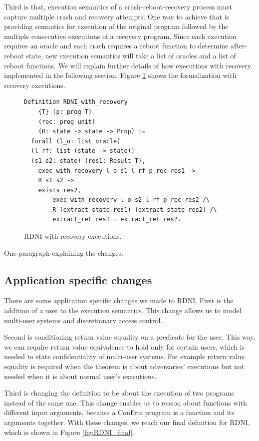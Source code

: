 Third is that, execution semantics of a crash-reboot-recovery process must capture multiple crash and recovery attempts. One way to achieve that is providing semantics for execution of the original program followed by the multiple consecutive executions of a recovery program. Since each execution requires an oracle and each crash requires a reboot function to determine after-reboot state, new execution semantics will take a list of oracles and a list of reboot functions. We will explain further details of how executions with recovery implemented in the following section. Figure \ref{fig:RDNI_recovery} shows the formalization with recovery executions.

\begin{figure}[ht]
    \centering
    \begin{verbatim}
Definition RDNI_with_recovery
    {T} (p: prog T) 
    (rec: prog unit)
    (R: state -> state -> Prop) :=
  forall (l_o: list oracle) 
  (l_rf: list (state -> state))
  (s1 s2: state) (res1: Result T),
    exec_with_recovery l_o s1 l_rf p rec res1 ->
    R s1 s2 ->
    exists res2,
        exec_with_recovery l_o s2 l_rf p rec res2 /\
        R (extract_state res1) (extract_state res2) /\
        extract_ret res1 = extract_ret res2.
    \end{verbatim}
    \caption{RDNI with recovery executions.}
    \label{fig:RDNI_recovery}
\end{figure}

{\color{red} One paragraph explaining the changes.}


\subsection{Application specific changes}
There are some application specific changes we made to RDNI. First is the addition of a user to the execution semantics. This change allows us to model multi-user systems and discretionary access control.

Second is conditioning return value equality on a predicate for the user. This way, we can require return value equivalence to hold only for certain users, which is needed to state confidentiality of multi-user systems. For example return value equality is required when the theorem is about adversaries' executions but not needed when it is about normal user's executions.

Third is changing the definition to be about the execution of two programs instead of the same one. This change enables us to reason about functions with different input arguments, because a ConFrm program is a function and its arguments together. 
With these changes, we reach our final definition for RDNI, which is shown in Figure \ref{fig:RDNI_final}.


